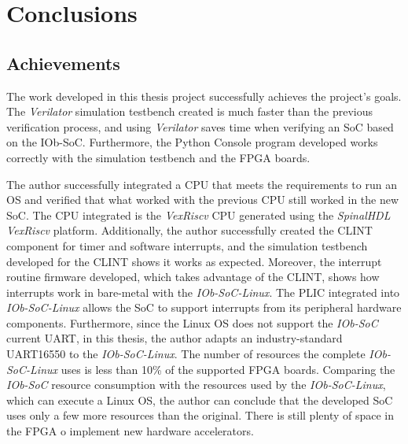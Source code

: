 
\section{Conclusions}
\label{sec:concl}

\subsection{Achievements}
The work developed in this thesis project successfully achieves the project's goals. The \textit{Verilator} simulation testbench created is much faster than the previous verification process, and using \textit{Verilator} saves time when verifying an SoC based on the IOb-SoC. Furthermore, the Python Console program developed works correctly with the simulation testbench and the FPGA boards.

The author successfully integrated a CPU that meets the requirements to run an OS and verified that what worked with the previous CPU still worked in the new SoC. The CPU integrated is the \textit{VexRiscv} CPU generated using the \textit{SpinalHDL}  \textit{VexRiscv} platform. Additionally, the author successfully created the CLINT component for timer and software interrupts, and the simulation testbench developed for the CLINT shows it works as expected. Moreover, the interrupt routine firmware developed, which takes advantage of the CLINT, shows how interrupts work in bare-metal with the \textit{IOb-SoC-Linux}. The PLIC integrated into \textit{IOb-SoC-Linux} allows the SoC to support interrupts from its peripheral hardware components. Furthermore, since the Linux OS does not support the \textit{IOb-SoC} current UART, in this thesis, the author adapts an industry-standard UART16550 to the \textit{IOb-SoC-Linux}. The number of resources the complete \textit{IOb-SoC-Linux} uses is less than 10\% of the supported FPGA boards. Comparing the \textit{IOb-SoC} resource consumption with the resources used by the \textit{IOb-SoC-Linux}, which can execute a Linux OS, the author can conclude that the developed SoC uses only a few more resources than the original. There is still plenty of space in the FPGA o implement new hardware accelerators.

